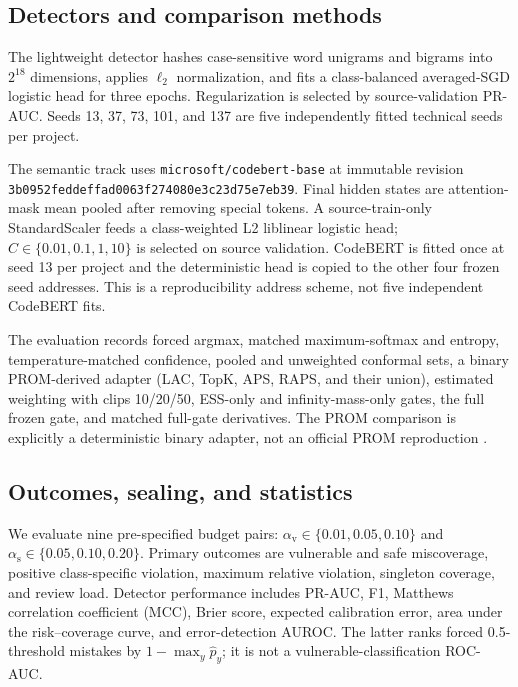 \documentclass[preprint,12pt]{elsarticle}
\newcommand{\av}{\alpha_{\mathrm{v}}}
\newcommand{\as}{\alpha_{\mathrm{s}}}
\begin{document}
\subsection{Detectors and comparison methods}

The lightweight detector hashes case-sensitive word unigrams and bigrams into $2^{18}$ dimensions, applies $\ell_2$ normalization, and fits a class-balanced averaged-SGD logistic head for three epochs. Regularization is selected by source-validation PR-AUC. Seeds 13, 37, 73, 101, and 137 are five independently fitted technical seeds per project.

The semantic track uses \texttt{microsoft/codebert-base} at immutable revision \texttt{3b0952feddeffad0063f274080e3c23d75e7eb39}. Final hidden states are attention-mask mean pooled after removing special tokens. A source-train-only StandardScaler feeds a class-weighted L2 liblinear logistic head; $C\in\{0.01,0.1,1,10\}$ is selected on source validation. CodeBERT is fitted once at seed 13 per project and the deterministic head is copied to the other four frozen seed addresses. This is a reproducibility address scheme, not five independent CodeBERT fits.

The evaluation records forced argmax, matched maximum-softmax and entropy, temperature-matched confidence, pooled and unweighted conformal sets, a binary PROM-derived adapter (LAC, TopK, APS, RAPS, and their union), estimated weighting with clips 10/20/50, ESS-only and infinity-mass-only gates, the full frozen gate, and matched full-gate derivatives. The PROM comparison is explicitly a deterministic binary adapter, not an official PROM reproduction \cite{wang2025prom}.

\subsection{Outcomes, sealing, and statistics}

We evaluate nine pre-specified budget pairs: $\av\in\{0.01,0.05,0.10\}$ and $\as\in\{0.05,0.10,0.20\}$. Primary outcomes are vulnerable and safe miscoverage, positive class-specific violation, maximum relative violation, singleton coverage, and review load. Detector performance includes PR-AUC, F1, Matthews correlation coefficient (MCC), Brier score, expected calibration error, area under the risk--coverage curve, and error-detection AUROC. The latter ranks forced 0.5-threshold mistakes by $1-\max_y\widehat p_y$; it is not a vulnerable-classification ROC-AUC.
\end{document}
